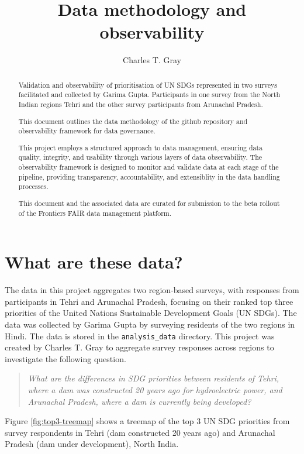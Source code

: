 \documentclass{article}
\title{Data methodology and observability}
\author{Charles T. Gray}
\begin{document}
\maketitle

\tableofcontents


\begin{abstract}
Validation and observability of prioritisation of UN SDGs represented in two surveys facilitated and collected by Garima Gupta. Participants in one survey from the North Indian regions Tehri and the other survey participants from Arunachal Pradesh. 

This document outlines the data methodology of the github repository and observability framework for data governance. 

This project employs a structured approach to data management, ensuring data quality, integrity, and usability through various layers of data observability. The observability framework is designed to monitor and validate data at each stage of the pipeline, providing transparency, accountability, and extensiblity in the data handling processes.

This document and the associated data are curated for submission to the beta rollout of the Frontiers FAIR data management platform.

\end{abstract}

\section{What are these data?}

The data in this project aggregates two region-based surveys, with responses from participants in Tehri and Arunachal Pradesh, focusing on their ranked top three priorities of the United Nations Sustainable Development Goals (UN SDGs). The data was collected by Garima Gupta by surveying residents of the two regions in Hindi. The data is stored in the \texttt{analysis\_data} directory. This project was created by Charles T. Gray  to aggregate survey responses across regions to investigate the following question.

\begin{quote}
  \textit{What are the differences in SDG priorities between residents of Tehri, where a dam was constructed 20 years ago for hydroelectric power, and Arunachal Pradesh, where a dam is currently being developed?}
\end{quote}

Figure \ref{fig:top3-treemap} shows a treemap of the top 3 UN SDG priorities from survey respondents in Tehri (dam constructed 20 years ago) and Arunachal Pradesh (dam under development), North India.
\end{document}
